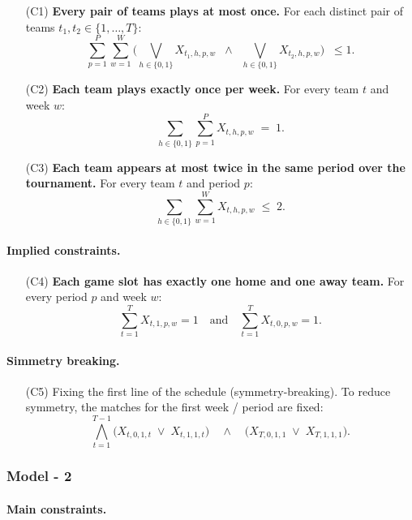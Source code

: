 \documentclass{article}
\begin{document}
\begin{itemize}
\item[(C1)] \textbf{Every pair of teams plays at most once.}  
For each distinct pair of teams $t_1,t_2 \in \{1,\dots,T\}$:
\[
\sum_{p=1}^{P}\sum_{w=1}^{W}
\Big( \bigvee_{h\in\{0,1\}} X_{t_1,h,p,w} \;\;\land\;\;
       \bigvee_{h\in\{0,1\}} X_{t_2,h,p,w} \Big)
\;\;\leq 1.
\]

\item[(C2)] \textbf{Each team plays exactly once per week.}  
For every team $t$ and week $w$:
\[
\sum_{h\in\{0,1\}}\sum_{p=1}^{P} X_{t,h,p,w} \;=\; 1.
\]

\item[(C3)] \textbf{Each team appears at most twice in the same period over the tournament.}  
For every team $t$ and period $p$:
\[
\sum_{h\in\{0,1\}}\sum_{w=1}^{W} X_{t,h,p,w} \;\leq\; 2.
\]
\end{itemize}

\paragraph{Implied constraints.}

\begin{itemize}
\item[(C4)] \textbf{Each game slot has exactly one home and one away team.}  
For every period $p$ and week $w$:
\[
\sum_{t=1}^{T} X_{t,1,p,w} = 1
\quad\text{and}\quad
\sum_{t=1}^{T} X_{t,0,p,w} = 1.
\]
\end{itemize}

\paragraph{Simmetry breaking.}

\begin{itemize}
\item[(C5)] {Fixing the first line of the schedule (symmetry-breaking).}  
To reduce symmetry, the matches for the first week / period are fixed:
\[
\bigwedge_{t=1}^{T-1} \big( X_{t,0,1,t} \;\lor\; X_{t,1,1,t} \big)
\quad\land\quad
\big( X_{T,0,1,1} \;\lor\; X_{T,1,1,1} \big).
\]
\end{itemize}

\subsubsection{Model - 2 }

\paragraph{Main constraints.}
\end{document}

